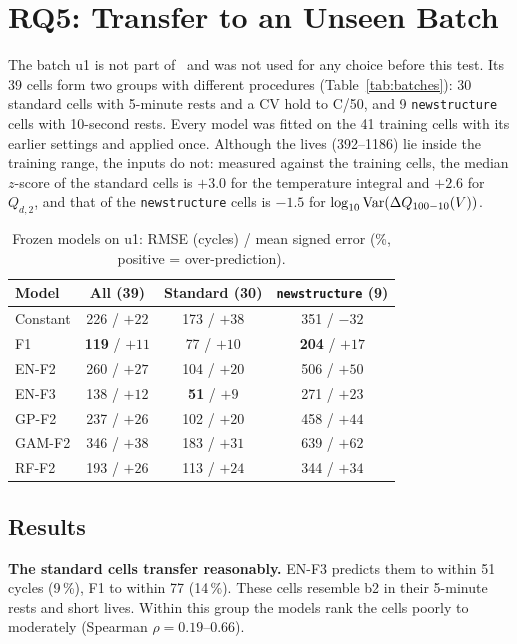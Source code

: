 \section{RQ5: Transfer to an Unseen Batch}
\label{sec:rq5}

The batch u1 is not part of~\cite{severson2019} and was not used for any
choice before this test. Its 39 cells form two groups with different
procedures (Table~\ref{tab:batches}): 30 standard cells with 5-minute rests
and a CV hold to C/50, and 9 \texttt{newstructure} cells with 10-second rests.
Every model was fitted on the 41 training cells with its earlier settings and
applied once. Although the lives (392--1186) lie inside the training range,
the inputs do not: measured against the training cells, the median
$z$-score of the standard cells is $+3.0$ for the temperature integral and
$+2.6$ for $Q_{d,2}$, and that of the \texttt{newstructure} cells is $-1.5$
for $\log_{10}\mathrm{Var}(\Delta Q_{100-10}(V))$.

\begin{table}[!htb]
\centering
\caption{Frozen models on u1: RMSE (cycles) / mean signed error (\%,
positive = over-prediction).}
\label{tab:rq5}
\footnotesize
\setlength{\tabcolsep}{4pt}
\begin{tabular}{@{}lccc@{}}
\toprule
Model & All (39) & Standard (30) & \texttt{newstructure} (9) \\
\midrule
Constant & 226 / $+22$ & 173 / $+38$ & 351 / $-32$ \\
F1 & \textbf{119} / $+11$ & 77 / $+10$ & \textbf{204} / $+17$ \\
EN-F2 & 260 / $+27$ & 104 / $+20$ & 506 / $+50$ \\
EN-F3 & 138 / $+12$ & \textbf{51} / $+9$ & 271 / $+23$ \\
GP-F2 & 237 / $+26$ & 102 / $+20$ & 458 / $+44$ \\
GAM-F2 & 346 / $+38$ & 183 / $+31$ & 639 / $+62$ \\
RF-F2 & 193 / $+26$ & 113 / $+24$ & 344 / $+34$ \\
\bottomrule
\end{tabular}
\end{table}

\subsection{Results}
\textbf{The standard cells transfer reasonably.} EN-F3 predicts them to
within 51 cycles (9\,\%), F1 to within 77 (14\,\%). These cells resemble b2
in their 5-minute rests and short lives. Within this group the models rank the
cells poorly to moderately (Spearman $\rho=0.19$--0.66).


